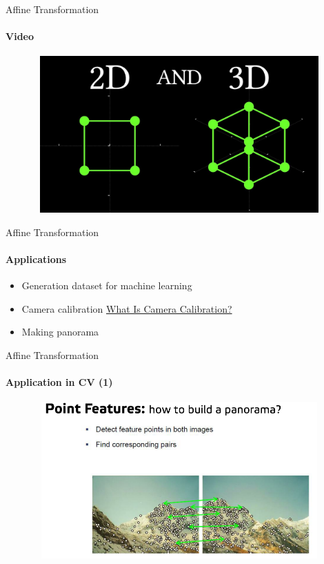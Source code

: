 \documentclass[aspectratio=169]{beamer}
\begin{document}
\begin{frame}[t]{Affine Transformation}
    \framesubtitle{Video}
    \vspace{-0.6cm}
    \begin{figure}[H]
        \href{https://youtu.be/E3Phj6J287o}{
            \centering\includegraphics[height=6cm,width=1\textwidth,keepaspectratio]{num_intuition_3d.jpg}}
        \label{fig:num_intuition_3d.jpg}
    \end{figure}
\end{frame}

\begin{frame}[t]{Affine Transformation}
\framesubtitle{Applications}
    \begin{itemize}
        \item Generation dataset for machine learning
        \item Camera calibration \href{https://www.mathworks.com/help/vision/ug/camera-calibration.html}{What Is Camera Calibration?}
        \item Making panorama
    \end{itemize}
\end{frame}

\begin{frame}[t]{Affine Transformation}
    \framesubtitle{Application in CV (1)}
        \vspace{-0.6cm}
        \begin{figure}[H]
            \centering\includegraphics[height=6cm,width=1\textwidth,keepaspectratio]{cv_intro.png}
            \label{fig:cv_intro.png}
        \end{figure}
    \end{frame}
\end{document}
